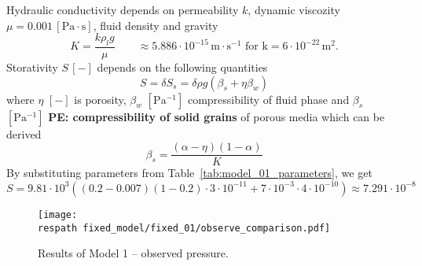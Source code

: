 \documentclass{article}
\def\unit#1{\mathrm{#1}}
\def\bunit#1{[\mathrm{#1}]}
\newcommand{\pe}[1]{{\color{red} \textbf{PE: #1}}}
\newcommand{\respath}{results/}
\newcommand{\eq}[1]{\begin{equation}{#1}\end{equation}}
\newcommand\tabref[1]{Table~\ref{#1}}
\begin{document}
Hydraulic conductivity depends on permeability $k$, dynamic viscozity $\mu = 0.001\,\bunit{Pa\cdot s}$, fluid density and gravity
\eq{K = \frac{k\rho_l g}{\mu}
\qquad \approx 5.886\cdot10^{-15}\,\unit{m\cdot s^{-1} \mbox{ for } k = 6\cdot10^{-22}\,\unit{m^2}}.
}
%
Storativity $S\,\bunit{-}$ depends on the following quantities
\eq{S = \delta S_s = \delta \rho g \left(\beta_s + \eta \beta_w\right)}
where $\eta$ $\bunit{-}$ is porosity, $\beta_w$ $\bunit{Pa^{-1}}$ compressibility of fluid phase and
$\beta_s$ $\bunit{Pa^{-1}}$ \pe{compressibility of solid grains} of porous media which can be derived
\eq{ \beta_s = \frac{(\alpha-\eta)(1-\alpha)}{K} }
%
By substituting parameters from \tabref{tab:model_01_parameters}, we get
\eq{ S = 9.81\cdot10^3\left((0.2-0.007)(1-0.2)\cdot 3\cdot10^{-11}
+ 7\cdot10^{-3} \cdot 4\cdot10^{-10}\right) \approx 7.291\cdot10^{-8}}

\begin{figure}[!htb]
    \centering
    \texttt{[image: \\respath fixed\_model/fixed\_01/observe\_comparison.pdf]}
    \caption{Results of Model 1 -- observed pressure.}
    \label{fig:model_01_observe_pressure}
\end{figure}

\end{document}
